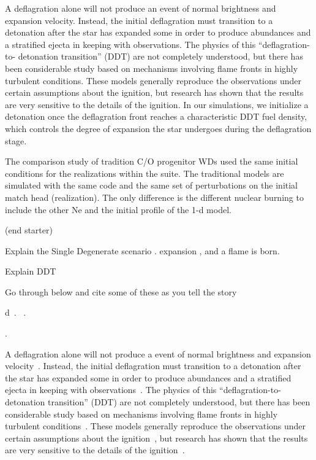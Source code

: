 \documentclass[iop,apj]{emulateapj}
\begin{document}
A deflagration alone will not produce an event of normal
brightness and expansion velocity. Instead, the initial
deflagration must transition to a detonation after the star has
expanded some in order to produce abundances and a stratified
ejecta in keeping with observations. The physics of this
“deflagration-to- detonation transition” (DDT) are not
completely understood, but there has been considerable study
based on mechanisms involving flame fronts in highly turbulent
conditions. These models generally reproduce the observations
under certain assumptions about the ignition, but research has
shown that the results are very sensitive to the details of the
ignition. In our simulations, we initialize a detonation once
the deflagration front reaches a characteristic DDT fuel density,
which controls the degree of expansion the star undergoes during
the deflagration stage.

The comparison study of tradition C/O progenitor WDs used the same initial
conditions for the realizations within the suite. The traditional models
are simulated with the same code and the same set of perturbations on the
initial match head (realization). The only difference is the different
nuclear burning to include the other Ne and the initial profile of the
1-d model. 

(end starter)


Explain the Single Degenerate scenario
\citep{Baraffe2004Stability-of-Su,WoosWunsKuhl04,wunschwoosley2004,Kuhletal06,nonakaetal2012}.
expansion \citep{Nomo84,WoosWunsKuhl04}, and a flame is born. 

Explain DDT

Go through below and cite some of these as you tell the story

d~\citep{arnett.truran.ea:nucleosynthesis}.
~\citep{mazzalietal2008}.  


\citep{khokhlov1993,bychovliberman1995,
SNrt,Khok95,NiemHill95,khoketal1997,ZingDurs07,
cholazarianvishniac2003,
roepkehn2003,roepkehn2004,
Zingale2005Three-dimension,Schmetal06a, Schmetal06b,Aspdetal08,
Woosetal09,csetal2009,hicksrosner2013,c-ssr2013,
jacketal2014,poludnenko2015,hicks2015}.


A deflagration alone will not produce a event of normal brightness and
expansion velocity~\citep{roepkeetal07}. Instead, the initial
deflagration must transition to a detonation after the star has
expanded some in order to produce abundances and a stratified ejecta
in keeping with
observations~\citep{Khokhlov1991Delayed-detonat,hokowh95}.
The physics of this ``deflagration-to-detonation transition'' (DDT)
are not completely understood, but there has been considerable study
based on mechanisms involving flame fronts in highly turbulent
conditions~\citep{1986SvAL, woosley90, Khokhlov1991Delayed-detonat,
  hokowh95, HoefKhok96, khoketal1997, NiemWoos97, hwt98, Niem99,
  GameKhokOran05,roepke07, poletal2011,c-ssr2013,poludnenko2015}.
These models generally reproduce the observations under certain
assumptions about the ignition~\citep{townetal2009}, but research has
shown that the results are very sensitive to the details of the
ignition~\citep{PlewCaldLamb04,GameKhokOran05,garciasenz:2005,
  roepkeetal07,Jordan2008Three-Dimension}.
\end{document}
